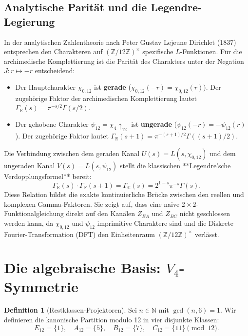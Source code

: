 \documentclass[11pt,a4paper]{article}
\theoremstyle{definition}
\newtheorem{definition}[theorem]{Definition}
\begin{document}
	\subsection{Analytische Parität und die Legendre-Legierung}
	In der analytischen Zahlentheorie nach Peter Gustav Lejeune Dirichlet (1837) entsprechen den Charakteren auf $(\mathbb{Z}/12\mathbb{Z})^\times$ spezifische $L$-Funktionen. 
	Für die archimedische Komplettierung ist die Parität des Charakters unter der Negation $J: r \mapsto -r$ entscheidend:
	\begin{itemize}
		\item Der Hauptcharakter $\chi_{0,12}$ ist \textbf{gerade} ($\chi_{0,12}(-r) = \chi_{0,12}(r)$). Der zugehörige Faktor der archimedischen Komplettierung lautet $\Gamma_{\mathbb{R}}(s) = \pi^{-s/2} \Gamma(s/2)$.
		\item Der gehobene Charakter $\psi_{12} = \chi_4 \uparrow_{12}$ ist \textbf{ungerade} ($\psi_{12}(-r) = -\psi_{12}(r)$). Der zugehörige Faktor lautet $\Gamma_{\mathbb{R}}(s+1) = \pi^{-(s+1)/2} \Gamma((s+1)/2)$.
	\end{itemize}
	
	Die Verbindung zwischen dem geraden Kanal $U(s) = L(s, \chi_{0,12})$ und dem ungeraden Kanal $V(s) = L(s, \psi_{12})$ stellt die klassischen **Legendre'sche Verdopplungsformel** bereit:
	\begin{equation}
		\Gamma_{\mathbb{R}}(s) \cdot \Gamma_{\mathbb{R}}(s+1) = \Gamma_{\mathbb{C}}(s) = 2^{1-s} \pi^{-s} \Gamma(s).
	\end{equation}
	Diese Relation bildet die exakte kontinuierliche Brücke zwischen den reellen und komplexen Gamma-Faktoren. Sie zeigt auf, dass eine naive $2 \times 2$-Funktionalgleichung direkt auf den Kanälen $Z_{EA}$ und $Z_{BC}$ nicht geschlossen werden kann, da $\chi_{0,12}$ und $\psi_{12}$ imprimitive Charaktere sind und die Diskrete Fourier-Transformation (DFT) den Einheitenraum $(\mathbb{Z}/12\mathbb{Z})^\times$ verlässt.
	
	\section{Die algebraische Basis: $V_4$-Symmetrie}
	
	\begin{definition}[Restklassen-Projektoren]
		Sei $n \in \mathbb{N}$ mit $\gcd(n, 6) = 1$. Wir definieren die kanonische Partition modulo 12 in vier disjunkte Klassen:
		\[
		E_{12} = \{1\}, \quad A_{12} = \{5\}, \quad B_{12} = \{7\}, \quad C_{12} = \{11\} \pmod{12}.
		\]
	\end{definition}
	
\end{document}

